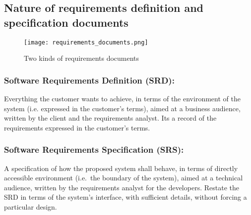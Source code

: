 \subsection{Nature of requirements definition and specification documents}

\begin{figure}[!ht]
    \centering
    \texttt{[image: requirements\_documents.png]}
    \caption{Two kinds of requirements documents}
\end{figure}
\FloatBarrier{}

\subsubsection{Software Requirements Definition (SRD):}
Everything the customer wants to achieve, in terms of the environment of the system (i.e.
expressed in the customer’s terms), aimed at a business audience, written by the client and
the requirements analyst. Its a record of the requirements expressed in the
customer's terms.

\subsubsection{Software Requirements Specification (SRS):}

A specification of how the proposed system shall behave, in terms of directly accessible
environment (i.e.\ the boundary of the system), aimed at a technical audience, written by
the requirements analyst for the developers.
Restate the SRD in terms of the system’s interface, with sufficient details, without forcing a
particular design.
